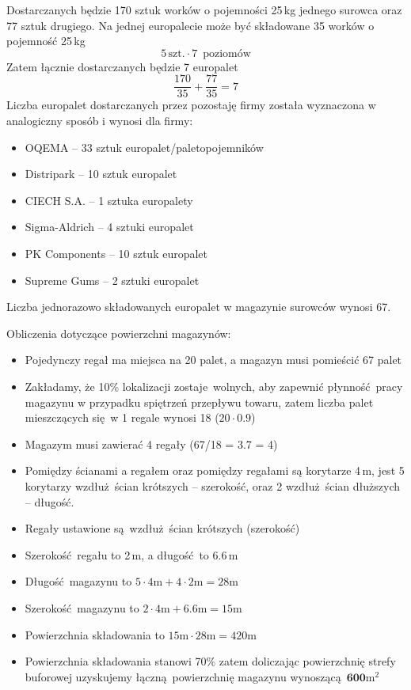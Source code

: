 Dostarczanych będzie 170 sztuk worków o pojemności 25\,kg jednego surowca oraz 77 sztuk drugiego. Na jednej europalecie może być składowane 35 worków o pojemność 25\,kg
\[
	5\,\mathrm{szt.} \cdot 7\,\text{ poziomów}
\]
Zatem łącznie dostarczanych będzie 7 europalet
\[
	\frac{170}{35} + \frac{77}{35} = 7
\]
Liczba europalet dostarczanych przez pozostaję firmy została wyznaczona w analogiczny sposób i wynosi dla firmy:
\begin{itemize}
	\item \textsf{OQEMA} -- 33 sztuk europalet/paletopojemników
	\item \textsf{Distripark} -- 10 sztuk europalet
	\item \textsf{CIECH S.A.} -- 1 sztuka europalety
	\item \textsf{Sigma-Aldrich} -- 4 sztuki europalet
	\item \textsf{PK Components} -- 10 sztuk europalet
	\item \textsf{Supreme Gums} -- 2 sztuki europalet
\end{itemize}

Liczba jednorazowo składowanych europalet w magazynie surowców wynosi 67.\vspace{\baselineskip}

Obliczenia dotyczące powierzchni magazynów:
\begin{itemize}
	\item Pojedynczy regał ma miejsca na 20 palet, a magazyn musi pomieścić 67 palet
	\item Zakładamy, że 10\% lokalizacji zostaje wolnych, aby zapewnić płynność pracy magazynu w przypadku spiętrzeń przepływu towaru, zatem liczba palet mieszczących się w 1 regale wynosi 18 ($20 \cdot 0.9$)
	\item Magazym musi zawierać 4 regały (67/18 = 3.7 = 4)
	\item Pomiędzy ścianami a regałem oraz pomiędzy regałami są korytarze 4\,m, jest 5 korytarzy wzdłuż ścian krótszych -- szerokość, oraz 2 wzdłuż ścian dłuższych -- długość.
	\item Regały ustawione są wzdłuż ścian krótszych (szerokość)
	\item Szerokość regału to 2\,m, a długość to 6.6\,m
	\item Długość magazynu to $5 \cdot 4\mathrm{m} + 4 \cdot 2\mathrm{m} = 28\mathrm{m}$
	\item Szerokość magazynu to $2\cdot 4\mathrm{m} + 6.6\mathrm{m} = 15\mathrm{m}$
	\item Powierzchnia składowania to $15\mathrm{m} \cdot 28\mathrm{m} = 420\mathrm{m}$
	\item Powierzchnia składowania stanowi 70\% zatem doliczając powierzchnię strefy buforowej uzyskujemy łączną powierzchnię magazynu wynoszącą $\mathbf{600\mathrm{m^{2}}}$
\end{itemize}\vspace{\baselineskip}

